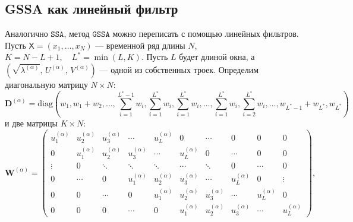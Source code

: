 \documentclass[12pt, specialist, subf
]{disser}
\theoremstyle{definition}
\newcommand{\SSA}{\texttt{SSA}}
\newcommand{\GSSA}{\texttt{GSSA}}
\newcommand{\TS}{\mathsf{X}}
\begin{document}
\subsection{GSSA как линейный фильтр}
Аналогично $\SSA$, метод $\GSSA$ можно переписать с помощью линейных фильтров.
Пусть $\TS = (x_1, \dots, x_{N})$ --- временной ряд длины $N$, $K = N - L + 1, \quad L^{*} = \min(L, K)$. Пусть $L$ будет длиной окна, а $(\sqrt{\lambda^{(\alpha)}},\,U^{(\alpha)},\,V^{(\alpha)})$ — одной из собственных троек. Определим диагональную матрицу $N \times N$:
$$
	\mathbf{D}^{(\alpha)} = \text{diag}(w_1, w_1 + w_2, \ldots,
	\sum \limits_{i = 1}^{L^*-1}w_i,
	\sum \limits_{i = 1}^{L^*}w_i, \sum \limits_{i = 1}^{L^*}w_i, \ldots, \sum \limits_{i = 1}^{L^*}w_i,
	\sum \limits_{i = 2}^{L^*}w_i, \ldots, w_{L^*-1}+ w_{L^*}, w_{L^*})
$$
и две матрицы  $K \times N$:
\[
	\mathbf{W}^{(\alpha)} = \begin{pmatrix}
		u_{1}^{(\alpha)} & u_{2}^{(\alpha)} & u_{3}^{(\alpha)} & \cdots           & u_{L}^{(\alpha)} & 0                & \cdots           & 0                & 0                & 0                \\
		0                & u_{1}^{(\alpha)} & u_{2}^{(\alpha)} & u_{3}^{(\alpha)} & \cdots           & u_{L}^{(\alpha)} & 0                & \cdots           & 0                & 0                \\
		\vdots           & 0                & \ddots           & \ddots           & \ddots           & \cdots           & \ddots           & 0                & \cdots           & 0                \\
		0                & \cdots           & 0                & u_{1}^{(\alpha)} & u_{2}^{(\alpha)} & u_{3}^{(\alpha)} & \cdots           & u_{L}^{(\alpha)} & 0                & \vdots           \\
		0                & 0                & \cdots           & 0                & u_{1}^{(\alpha)} & u_{2}^{(\alpha)} & u_{3}^{(\alpha)} & \cdots           & u_{L}^{(\alpha)} & 0                \\
		0                & 0                & 0                & \cdots           & 0                & u_{1}^{(\alpha)} & u_{2}^{(\alpha)} & u_{3}^{(\alpha)} & \cdots           & u_{L}^{(\alpha)}
	\end{pmatrix},
\]
\end{document}
